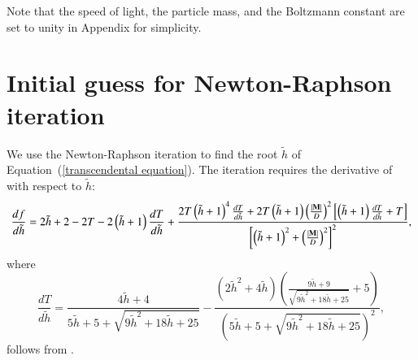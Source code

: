 \documentclass[twocolumn]{aastex63}
\begin{document}


\appendix
Note that the speed of light, the particle mass, and the Boltzmann constant are set to unity in Appendix for simplicity.

\section{Initial guess for Newton-Raphson iteration}
\label{The choice of initial guesses}
We use the Newton-Raphson iteration to find the root $\tilde{h}$ of Equation~(\ref{transcendental equation}). The iteration requires the derivative of  with respect to $\tilde{h}$:
\begin{equation}
\frac{df}{d\tilde{h}}=2\tilde{h}+2-2T-2\left(\tilde{h}+1\right)\frac{dT}{d\tilde{h}}+\frac{2T\left(\tilde{h}+1\right)^4\frac{dT}{d\tilde{h}}+2T\left(\tilde{h}+1\right)\left(\frac{\abs{\mathbf{M}}}{D}\right)^2\left[\left(\tilde{h}+1\right)\frac{dT}{d\tilde{h}}+T\right]}{\left[\left(\tilde{h}+1\right)^2+\left(\frac{\abs{\mathbf{M}}}{D}\right)^2\right]^2},
\end{equation}
where
\begin{equation}
\frac{dT}{d\tilde{h}}=\frac{4\tilde{h}+4}{5\tilde{h}+5+\sqrt{9\tilde{h}^2+18\tilde{h}+25}}
-\frac{\left(2\tilde{h}^2+4\tilde{h}\right)\left(\frac{9\tilde{h}+9}{\sqrt{9\tilde{h}^2+18\tilde{h}+25}}+5\right)}{\left(5\tilde{h}+5+\sqrt{9\tilde{h}^2+18\tilde{h}+25}\right)^2},
\label{dT_dh}
\end{equation}
follows from .
\end{document}
